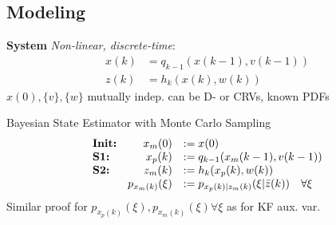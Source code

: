 \subsection{Modeling}
\vspace{0.2em}
\textbf{System} \textit{Non-linear, discrete-time}:
\begin{align*}
    x(k) &= q_{k-1}(x(k-1), v(k-1)) \\
    z(k) &= h_k(x(k), w(k))
\end{align*}
$x(0), \{v\}, \{w\}$ mutually indep. can be D- or CRVs, known PDFs


Bayesian State Estimator with Monte Carlo Sampling
\begin{align*}
    \begin{array}{l r l}
        \textbf{Init:} &x_m(0) &:= x(0) \\
        \textbf{S1:} &x_p(k) &:= q_{k-1}(x_m(k-1), v(k-1)) \\
        \textbf{S2:} &z_m(k) &:= h_k(x_p(k), w(k)) \\
        &p_{x_m(k)}(\xi) &:= p_{x_p(k)|z_m(k)}(\xi | \bar{z}(k)) \quad \forall\xi
    \end{array}
\end{align*}
Similar proof for $p_{x_p(k)}(\xi), p_{x_m(k)}(\xi) \forall\xi$ as for KF aux. var.
